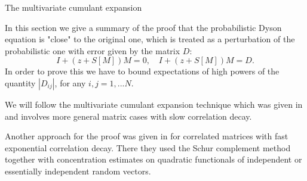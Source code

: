 \documentclass[11pt, a4paper, oneside]{book}
\numberwithin{equation}{chapter}
\begin{document}
\begin{section}{The multivariate cumulant expansion}
\label{s:Cumulants}

In this section we give a summary of the proof that the probabilistic Dyson equation is "close" to the original one, which is treated as a perturbation of the probabilistic one with error given by the matrix $D$:
\[
I + (z + S[M])M = 0 , \quad I + (z+S[M])M = D .
\]
%
In order to prove this we have to bound expectations of high powers of the quantity $|D_{ij}|$, for any $i,j=1,...N$. 

We will follow the multivariate cumulant expansion technique which was given in \cite{erdHos2019random} and involves more general matrix cases with slow correlation decay.

Another approach for the proof was given in \cite{ajanki2019stability} for correlated
matrices with fast exponential correlation decay. There they used the Schur complement method together with concentration estimates on quadratic functionals of independent or essentially independent random vectors.


\end{section}
\end{document}
